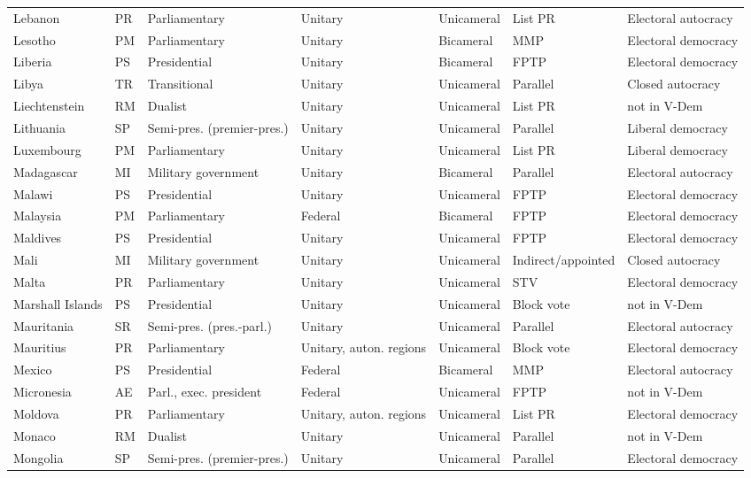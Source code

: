 \documentclass[11pt,a4paper]{article}
\begin{document}
{\begin{longtable}{p{2.9cm}lp{2.9cm}p{2.4cm}lp{1.9cm}p{2.0cm}}
Lebanon & PR & Parliamentary & Unitary & Unicameral & List PR & Electoral autocracy\\
Lesotho & PM & Parliamentary & Unitary & Bicameral & MMP & Electoral democracy\\
Liberia & PS & Presidential & Unitary & Bicameral & FPTP & Electoral democracy\\
Libya & TR & Transitional & Unitary & Unicameral & Parallel & Closed autocracy\\
Liechtenstein & RM & Dualist & Unitary & Unicameral & List PR & not in V-Dem\\
Lithuania & SP & Semi-pres. (premier-pres.) & Unitary & Unicameral & Parallel & Liberal democracy\\
Luxembourg & PM & Parliamentary & Unitary & Unicameral & List PR & Liberal democracy\\
Madagascar & MI & Military government & Unitary & Bicameral & Parallel & Electoral autocracy\\
Malawi & PS & Presidential & Unitary & Unicameral & FPTP & Electoral democracy\\
Malaysia & PM & Parliamentary & Federal & Bicameral & FPTP & Electoral democracy\\
Maldives & PS & Presidential & Unitary & Unicameral & FPTP & Electoral democracy\\
Mali & MI & Military government & Unitary & Unicameral & Indirect/appointed & Closed autocracy\\
Malta & PR & Parliamentary & Unitary & Unicameral & STV & Electoral democracy\\
Marshall Islands & PS & Presidential & Unitary & Unicameral & Block vote & not in V-Dem\\
Mauritania & SR & Semi-pres. (pres.-parl.) & Unitary & Unicameral & Parallel & Electoral autocracy\\
Mauritius & PR & Parliamentary & Unitary, auton. regions & Unicameral & Block vote & Electoral democracy\\
Mexico & PS & Presidential & Federal & Bicameral & MMP & Electoral autocracy\\
Micronesia & AE & Parl., exec. president & Federal & Unicameral & FPTP & not in V-Dem\\
Moldova & PR & Parliamentary & Unitary, auton. regions & Unicameral & List PR & Electoral democracy\\
Monaco & RM & Dualist & Unitary & Unicameral & Parallel & not in V-Dem\\
Mongolia & SP & Semi-pres. (premier-pres.) & Unitary & Unicameral & Parallel & Electoral democracy\\

\end{longtable}}
\end{document}
